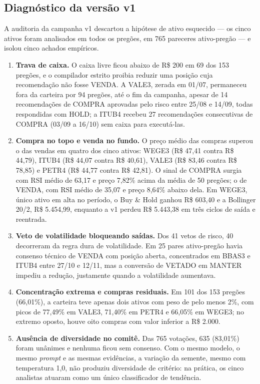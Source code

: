 \documentclass{eic-bcc-tcc}
\begin{document}
\subsection{Diagnóstico da versão v1}
\label{sec:res-v1}

A auditoria da campanha v1 descartou a hipótese de ativo esquecido --- os cinco ativos foram analisados em todos os pregões, em 765 pareceres ativo-pregão --- e isolou cinco achados empíricos.

\begin{enumerate}
    \item \textbf{Trava de caixa.} O caixa livre ficou abaixo de R\$ 200 em 69 dos 153 pregões, e o compilador estrito proibia reduzir uma posição cuja recomendação não fosse VENDA. A VALE3, zerada em 01/07, permaneceu fora da carteira por 94 pregões, até o fim da campanha, apesar de 14 recomendações de COMPRA aprovadas pelo risco entre 25/08 e 14/09, todas respondidas com HOLD; a ITUB4 recebeu 27 recomendações consecutivas de COMPRA (03/09 a 16/10) sem caixa para executá-las.
    \item \textbf{Compra no topo e venda no fundo.} O preço médio das compras superou o das vendas em quatro dos cinco ativos: WEGE3 (R\$ 47,41 contra R\$ 44,79), ITUB4 (R\$ 44,07 contra R\$ 40,61), VALE3 (R\$ 83,46 contra R\$ 78,85) e PETR4 (R\$ 44,77 contra R\$ 42,81). O sinal de COMPRA surgia com RSI médio de 63,17 e preço 7,82\% acima da média de 50 pregões; o de VENDA, com RSI médio de 35,07 e preço 8,64\% abaixo dela. Em WEGE3, único ativo em alta no período, o Buy \& Hold ganhou R\$ 603,40 e a Bollinger 20/2, R\$ 5.454,99, enquanto a v1 perdeu R\$ 5.443,38 em três ciclos de saída e reentrada.
    \item \textbf{Veto de volatilidade bloqueando saídas.} Dos 41 vetos de risco, 40 decorreram da regra dura de volatilidade. Em 25 pares ativo-pregão havia consenso técnico de VENDA com posição aberta, concentrados em BBAS3 e ITUB4 entre 27/10 e 12/11, mas a conversão de VETADO em MANTER impediu a redução, justamente quando a volatilidade aumentava.
    \item \textbf{Concentração extrema e compras residuais.} Em 101 dos 153 pregões (66,01\%), a carteira teve apenas dois ativos com peso de pelo menos 2\%, com picos de 77,49\% em VALE3, 71,40\% em PETR4 e 66,05\% em WEGE3; no extremo oposto, houve oito compras com valor inferior a R\$ 2.000.
    \item \textbf{Ausência de diversidade no comitê.} Das 765 votações, 635 (83,01\%) foram unânimes e nenhuma ficou sem consenso. Com o mesmo modelo, o mesmo \textit{prompt} e as mesmas evidências, a variação da semente, mesmo com temperatura 1,0, não produziu diversidade de critério: na prática, os cinco analistas atuaram como um único classificador de tendência.
\end{enumerate}
\end{document}
